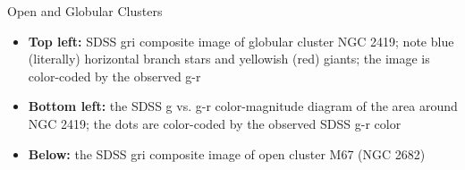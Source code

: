 \documentclass[letterpaper,landscape]{slides}
\begin{document}
\begin{slide}
{\begin{minipage}[t]{9cm}
\begin{center}
\end{center}
\end{minipage}

\begin{minipage}[t]{15cm}
\begin{center}
\vskip -1in
{\large \color{red} Open and Globular Clusters}
\end{center}


\begin{itemize}
\item {\bf Top left:} SDSS gri composite image of globular cluster NGC 2419;
         note blue (literally) horizontal branch stars and yellowish (red)
         giants; the image is color-coded by the observed  g-r
\item {\bf Bottom left:} the SDSS g vs. g-r color-magnitude diagram of the area 
       around NGC 2419; the dots are
       color-coded by the observed SDSS g-r color
\item {\bf Below:} the SDSS gri composite image of open cluster M67 (NGC 2682)
\end{itemize}
\vskip 0.0in

\end{minipage}}
\vfill 
\end{slide}
\end{document}
